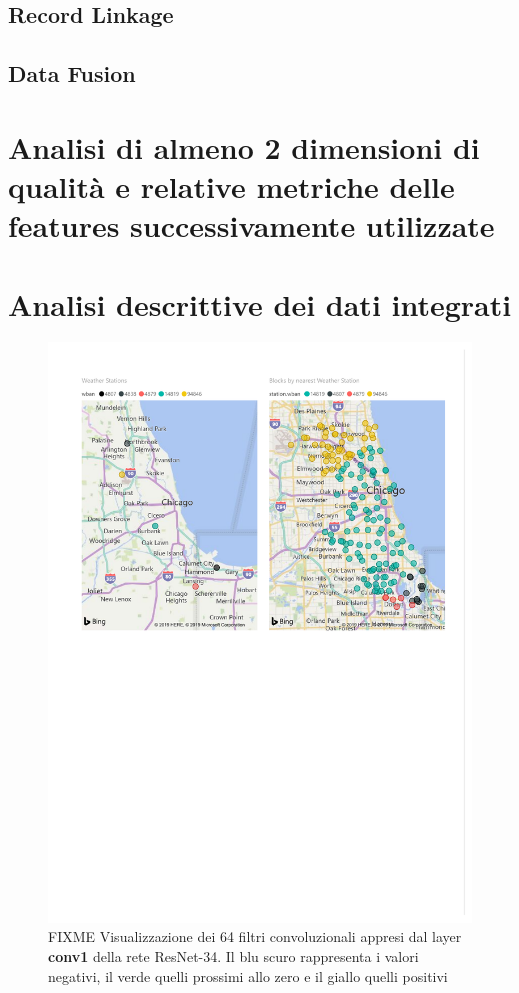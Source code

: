 \section{Record Linkage}
\label{sec:record-linkage}

\section{Data Fusion}

\chapter{Analisi di almeno 2 dimensioni di qualità e relative metriche delle features successivamente utilizzate}

\chapter{Analisi descrittive dei dati integrati}

\begin{figure}[htb]
	\centering
	\includegraphics[width=0.8\columnwidth]{images/WeatherStations}
	\caption{FIXME Visualizzazione dei 64 filtri convoluzionali appresi dal 
	layer \textbf{conv1} della rete ResNet-34. Il blu scuro rappresenta i 
	valori negativi, il verde quelli prossimi allo zero e il giallo quelli 
	positivi}
	\label{fig:weather-stations}
\end{figure}

